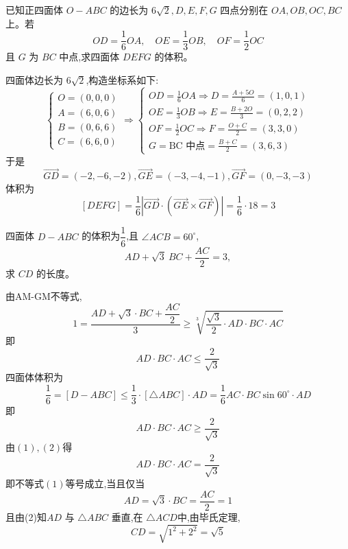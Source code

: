 \begin{questions}
    \question 已知正四面体 $O-ABC$ 的边长为 $6\sqrt{2},D,E,F,G$ 四点分别在 $OA, OB, OC, BC$ 上。若 
    \[
    OD=\frac{1}{6}OA,\quad OE=\frac{1}{3}OB,\quad OF=\frac{1}{2}OC
    \] 
    且 $G$ 为 $BC$ 中点,求四面体 $DEFG$ 的体积。
    \begin{solution}
        四面体边长为 $6\sqrt{2}$,构造坐标系如下:
        \[
        \begin{cases}
        O = (0,0,0) \\
        A = (6,0,6) \\
        B = (0,6,6) \\
        C = (6,6,0)
        \end{cases}
        \Rightarrow
        \begin{cases}
        {OD} = \frac{1}{6} {OA} \Rightarrow D = \frac{A + 5O}{6} = (1,0,1) \\
        {OE} = \frac{1}{3} {OB} \Rightarrow E = \frac{B + 2O}{3} = (0,2,2) \\
        {OF} = \frac{1}{2} {OC} \Rightarrow F = \frac{O + C}{2} = (3,3,0) \\
        G = \text{BC 中点} = \frac{B + C}{2} = (3,6,3)
        \end{cases}
        \]
        于是
        \[
        \overrightarrow{GD} = (-2,-6,-2),\overrightarrow{GE} = (-3,-4,-1),\overrightarrow{GF} = (0,-3,-3)
        \]
        体积为
        \[
        [DEFG] = \frac{1}{6} \left| \overrightarrow{GD} \cdot ( \overrightarrow{GE} \times \overrightarrow{GF} ) \right|
        = \frac{1}{6} \cdot 18 = 3
        \]
    \end{solution}

    \question 四面体 $D-ABC$ 的体积为$\dfrac{1}{6}$,且 $\angle ACB=60^{\circ}$,  
    \[
    AD + \sqrt{3}\: BC + \frac{AC}{2} = 3,
    \]
    求 $CD$ 的长度。
    \begin{solution}
        由AM-GM不等式,
        \[
        1=\dfrac{AD + \sqrt{3} \cdot BC + \dfrac{AC}{2}}{3} \ge \sqrt[3]{\frac{\sqrt{3}}{2} \cdot AD \cdot BC \cdot AC}
        \]
        即  
        \[
        AD \cdot BC \cdot AC \le \frac{2}{\sqrt{3}} \tag{1}
        \]
        四面体体积为  
        \[
        \frac{1}{6}=[D-ABC] \le \frac{1}{3} \cdot [\triangle ABC] \cdot AD = \frac{1}{6} AC \cdot BC \sin 60^\circ \cdot AD
        \]
        即  
        \[
        AD \cdot BC \cdot AC \ge \frac{2}{\sqrt{3}} \tag{2}
        \]
        由$(1),(2)$得  
        \[
        AD \cdot BC \cdot AC = \frac{2}{\sqrt{3}}
        \]
        即不等式$(1)$等号成立,当且仅当
        \[
        AD = \sqrt{3} \cdot BC = \frac{AC}{2} = 1
        \]
        且由(2)知$AD$ 与 $\triangle ABC$ 垂直,在 $\triangle ACD$中,由毕氏定理,  
        \[
        CD = \sqrt{1^2 + 2^2} = \sqrt{5}
        \]
    \end{solution}
    

\end{questions}
